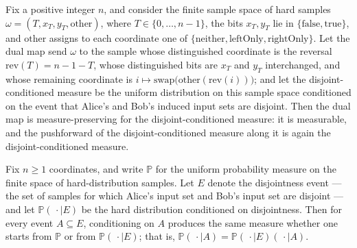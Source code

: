 \begin{theorem}
\label{CommunicationComplexity.Functions.Disjointness.RandomizedLowerBound.disjointCondMeasure_measurePreserving_dualHardSample}
\leanok
{}
Fix a positive integer $n$, and consider the finite sample space of hard samples $\omega
= (T, x_T, y_T, \text{other})$, where $T \in \{0, \dots, n-1\}$, the bits $x_T, y_T$ lie
in $\{\text{false}, \text{true}\}$, and $\text{other}$ assigns to each coordinate one of
$\{\text{neither}, \text{leftOnly}, \text{rightOnly}\}$. Let the dual map send $\omega$
to the sample whose distinguished coordinate is the reversal $\mathrm{rev}(T) = n-1-T$,
whose distinguished bits are $x_T$ and $y_T$ interchanged, and whose remaining
coordinate is $i \mapsto \mathrm{swap}\big(\text{other}(\mathrm{rev}(i))\big)$; and let
the disjoint-conditioned measure be the uniform distribution on this sample space
conditioned on the event that Alice's and Bob's induced input sets are disjoint. Then
the dual map is measure-preserving for the disjoint-conditioned measure: it is
measurable, and the pushforward of the disjoint-conditioned measure along it is again
the disjoint-conditioned measure.
\end{theorem}

\begin{theorem}
\label{CommunicationComplexity.Functions.Disjointness.RandomizedLowerBound.volume_cond_eq_disjointCondMeasure_cond_of_subset_disjointEvent}
\leanok
{}
Fix $n \ge 1$ coordinates, and write $\mathbb{P}$ for the uniform probability measure on
the finite space of hard-distribution samples. Let $E$ denote the disjointness event —
the set of samples for which Alice's input set and Bob's input set are disjoint — and
let $\mathbb{P}(\,\cdot \mid E)$ be the hard distribution conditioned on disjointness.
Then for every event $A \subseteq E$, conditioning on $A$ produces the same measure
whether one starts from $\mathbb{P}$ or from $\mathbb{P}(\,\cdot \mid E)$; that is,
$\mathbb{P}(\,\cdot \mid A) = \mathbb{P}(\,\cdot \mid E)(\,\cdot \mid A)$.
\end{theorem}


